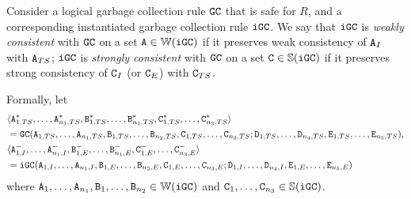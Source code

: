 \begin{property}\label{property:instantiated_gc_consistent}
Consider a logical garbage collection rule $\tt{GC}$ that is safe for $R$, and a corresponding instantiated garbage collection rule $\tt{iGC}$.
We say that
$\tt{iGC}$ is \emph{weakly consistent}   with $\tt{GC}$ on a set $\tt{A} \in \mathbb{W}(\tt{iGC})$ if it preserves weak consistency   of $\tt{A}_I$                 with $\tt{A}_{TS}$;
$\tt{iGC}$ is \emph{strongly consistent} with $\tt{GC}$ on a set $\tt{C} \in \mathbb{S}(\tt{iGC})$ if it preserves strong consistency of $\tt{C}_I$ (or $\tt{C}_E$) with $\tt{C}_{TS}$.

Formally, let
\begin{align*}
&\langle
\tt{A}_{1,TS}^*, \dots, \tt{A}_{n_1,TS}^*,
\tt{B}_{1,TS}^*, \dots, \tt{B}_{n_1,TS}^*, 
\tt{C}_{1,TS}^*, \dots, \tt{C}_{n_3,TS}^*
\rangle \\
&= \tt{GC}(
\tt{A}_{1,TS}, \dots, \tt{A}_{n_1,TS},
\tt{B}_{1,TS}, \dots, \tt{B}_{n_2,TS},
\tt{C}_{1,TS}, \dots, \tt{C}_{n_3,TS};
\tt{D}_{1,TS}, \dots, \tt{D}_{n_4,TS},
\tt{E}_{1,TS}, \dots, \tt{E}_{n_5,TS}
),\\
&\langle
\tt{A}_{1,I}^-, \dots, \tt{A}_{n_1,I}^-,
\tt{B}_{1,E}^-, \dots, \tt{B}_{n_1,E}^-,
\tt{C}_{1,E}^-, \dots, \tt{C}_{n_3,E}^-
\rangle\\
&= \tt{iGC}(
\tt{A}_{1,I}, \dots, \tt{A}_{n_1,I},
\tt{B}_{1,E}, \dots, \tt{B}_{n_2,E},
\tt{C}_{1,E}, \dots, \tt{C}_{n_3,E};
\tt{D}_{1,I}, \dots, \tt{D}_{n_4,I},
\tt{E}_{1,E}, \dots, \tt{E}_{n_5,E}
)
\end{align*}
where $\tt{A}_1, \dots, \tt{A}_{n_1}, \tt{B}_1, \dots, \tt{B}_{n_2} \in \mathbb{W}(\tt{iGC})$ and $\tt{C}_1, \dots, \tt{C}_{n_3} \in \mathbb{S}(\tt{iGC})$.


\end{property}
